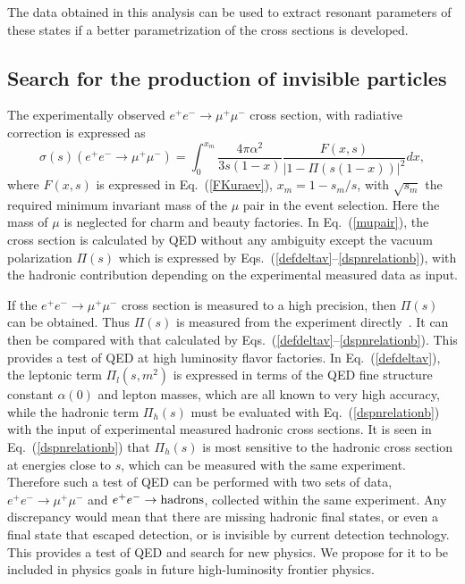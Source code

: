 \documentclass[aps,showpacs,superscriptaddress,preprint,tightenlines]{revtex4}
\newcommand{\EE}{e^+e^-}
\newcommand{\MM}{\mu^+\mu^-}
\begin{document}
The data obtained in this analysis can be used to extract 
resonant parameters of these states if a better parametrization
of the cross sections is developed.

\subsection{Search for the production of invisible particles}

The experimentally observed $\EE\to \MM$ cross section, 
with radiative correction is expressed as
\begin{equation}\label{mupair}
\sigma(s)(\EE\to \MM) = \int^{x_m}_0 \frac{4\pi\alpha^2}{3s(1-x)}  
\frac{F(x,s)}{|1-\Pi(s(1-x))|^2} dx,
\end{equation}
where $F(x,s)$ is expressed in Eq.~(\ref{FKuraev}), 
$x_m=1-s_m/s$, with $\sqrt{s_m}$ the required minimum invariant mass 
of the $\mu$ pair in the event selection. 
Here the mass of $\mu$ is neglected for charm and 
beauty factories. In Eq.~(\ref{mupair}), the cross section 
is calculated by QED without any ambiguity except the 
vacuum polarization $\Pi(s)$ which is expressed by 
Eqs.~(\ref{defdeltav}--\ref{dspnrelationb}), with the hadronic 
contribution depending on the experimental measured data as input. 

If the $\EE\to \MM$ cross section is measured to a high precision, 
then $\Pi(s)$ can be obtained. Thus $\Pi(s)$ is measured 
from the experiment directly~\cite{ref-ask-1-kloe}. It can then be compared with 
that calculated by Eqs.~(\ref{defdeltav}--\ref{dspnrelationb}).
This provides a test of QED at high luminosity flavor factories.
In Eq.~(\ref{defdeltav}), the leptonic term $\Pi_l(s,m^2)$ 
is expressed in terms of the QED fine structure constant $\alpha(0)$ 
and lepton masses, which are all known to very high accuracy,
while the hadronic term $\Pi_h(s)$ must be evaluated with 
Eq.~(\ref{dspnrelationb}) with the input of experimental 
measured hadronic cross sections. It is seen in Eq.~(\ref{dspnrelationb})  that
$\Pi_h(s)$ is most sensitive to the hadronic cross section
at energies close to $s$, which can be measured 
with the same experiment. Therefore such a test of QED can 
be performed with two sets of data, $\EE\to \mu^+\mu^-$ and 
$\EE\to {\rm hadrons}$, collected within the same experiment.  
Any discrepancy would mean that there are missing
hadronic final states, or even a final state that
escaped detection, or is invisible by current detection technology. 
This provides a test of QED and search for new physics.
We propose for it to be included in physics goals in 
future high-luminosity frontier physics.
\end{document}
